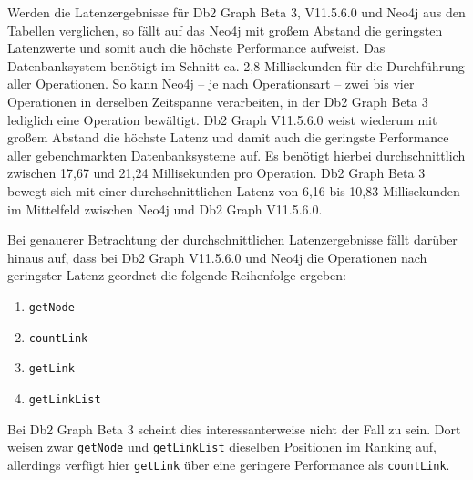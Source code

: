 \begin{table}[!ht]
\centering
{}
\caption{Latenz Linkbench-Const-10M Neo4j}
\label{tab:latenz_10m_const:neo4j}
\end{table}

Werden die Latenzergebnisse für Db2 Graph Beta 3, V11.5.6.0 und Neo4j aus den Tabellen verglichen, so fällt auf das Neo4j mit großem Abstand die geringsten Latenzwerte und somit auch die höchste Performance aufweist. Das Datenbanksystem benötigt im Schnitt ca. 2,8 Millisekunden für die Durchführung aller Operationen. So kann Neo4j -- je nach Operationsart -- zwei bis vier Operationen in derselben Zeitspanne verarbeiten, in der Db2 Graph Beta 3 lediglich eine Operation bewältigt. Db2 Graph V11.5.6.0 weist wiederum mit großem Abstand die höchste Latenz und damit auch die geringste Performance aller gebenchmarkten Datenbanksysteme auf. Es benötigt hierbei durchschnittlich zwischen 17,67 und 21,24 Millisekunden pro Operation. Db2 Graph Beta 3 bewegt sich mit einer durchschnittlichen Latenz von 6,16 bis 10,83 Millisekunden im Mittelfeld zwischen Neo4j und Db2 Graph V11.5.6.0.

Bei genauerer Betrachtung der durchschnittlichen Latenzergebnisse fällt darüber hinaus auf, dass bei Db2 Graph V11.5.6.0 und Neo4j die Operationen nach geringster Latenz geordnet die folgende Reihenfolge ergeben:
\begin{enumerate}
    \item \texttt{getNode}
    \item \texttt{countLink}
    \item \texttt{getLink}
    \item \texttt{getLinkList}
\end{enumerate}
Bei Db2 Graph Beta 3 scheint dies interessanterweise nicht der Fall zu sein. Dort weisen zwar \texttt{getNode} und \texttt{getLinkList} dieselben Positionen im Ranking auf, allerdings verfügt hier \texttt{getLink} über eine geringere Performance als \texttt{countLink}.


